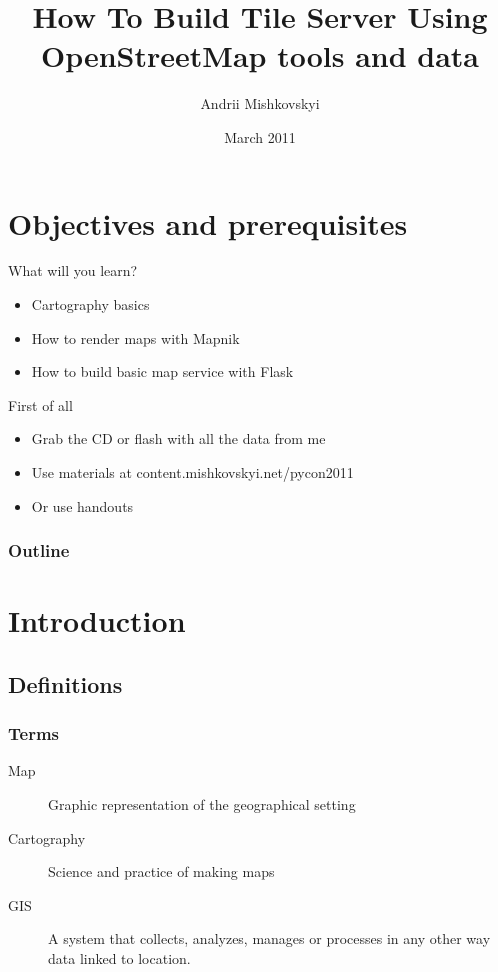 \documentclass{beamer}
\begin{document}
\title{How To Build Tile Server Using OpenStreetMap tools and data}
\author{Andrii Mishkovskyi}
\date{March 2011}

\maketitle

\section{Objectives and prerequisites}

\begin{frame}{What will you learn?}
  \begin{itemize}
  \item Cartography basics
  \item How to render maps with Mapnik
  \item How to build basic map service with Flask
  \end{itemize}
\end{frame}

\begin{frame}{First of all}
  \begin{itemize}
  \item Grab the CD or flash with all the data from me
  \item Use materials at content.mishkovskyi.net/pycon2011
  \item Or use handouts
  \end{itemize}
\end{frame}

\begin{frame}
  \frametitle{Outline}
  \tableofcontents
\end{frame}

\section{Introduction}

\subsection{Definitions}

\begin{frame}
  \frametitle{Terms}
  \begin{description}
  \item[Map] Graphic representation of the geographical setting
  \item[Cartography] Science and practice of making maps
  \item[GIS] A system that collects, analyzes, manages or processes in any other way data linked to location.
  \end{description}
\end{frame}
\end{document}
